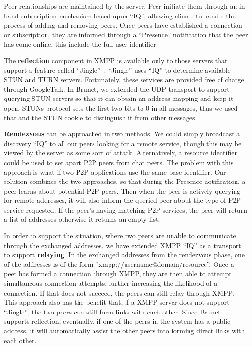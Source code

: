 \documentclass[conference]{IEEEtran}
\begin{document}
Peer relationships are maintained by the server.  Peer initiate them through an
in band subscription mechanism based upon ``IQ'', allowing clients to handle
the process of adding and removing peers.  Once peers have established a
connection or subscription, they are informed through a ``Presence''
notification that the peer has come online, this include the full user
identifier.

The \textbf{reflection} component in XMPP is available only to those servers
that support a feature called ``Jingle''~\cite{jingle}.  ``Jingle'' uses ``IQ''
to determine available STUN and TURN servers.  Fortunately, these services are
provided free of charge through GoogleTalk.  In Brunet, we extended the UDP
transport to support querying STUN servers so that it can obtain an address
mapping and keep it open.  STUNs protocol sets the first two bits to 0 in all
messages, thus we used that and the STUN cookie to distinguish it from other
messages.

\textbf{Rendezvous} can be approached in two methods.  We could simply
broadcast a discovery ``IQ'' to all our peers looking for a remote service,
though this may be viewed by the server as some sort of attack.  Alternatively,
a resource identifier could be used to set apart P2P peers from chat peers.
The problem with this approach is what if two P2P applications use the same
base identifier.  Our solution combines the two approaches, so that during the
Presence notification, a peer learns about potential P2P peers.  Then when the
peer is actively querying for remote addresses, it will also inform the queried
peer about the type of P2P service requested.  If the peer's having matching
P2P services, the peer will return a list of addresses otherwise it returns an
empty list.

In order to support the situation, where two peers are unable to communicate
through the exchanged addresses, we have extended XMPP ``IQ'' as a transport to
support \textbf{relaying}.  In the exchanged addresses from the rendezvous phase,
one of the addresses is of the form ``xmpp://username@domain/resource''.  Once
a peer has formed a connection through XMPP, they are then able to attempt
simultaneous connection attempts, further increasing the likelihood of a
connection.  If that does not succeed, the peers can still relay through XMPP.
This approach also has the benefit that, if a XMPP server does not support
``Jingle'', the two peers can still form links with each other.  Since Brunet
supports reflection, eventually, if one of the peers in the system has a
public address, it will automatically assist the other peers into forming
direct links with each other.
\end{document}
